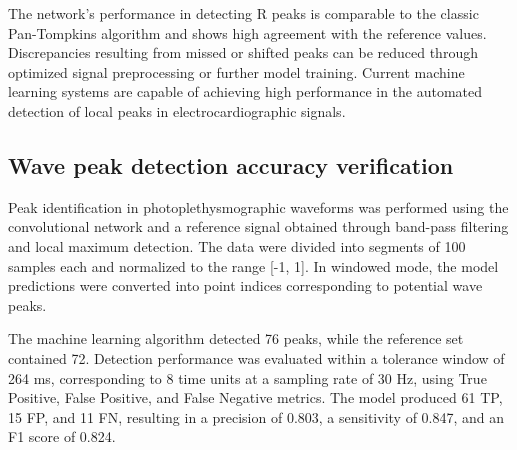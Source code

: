\documentclass{citask}
\begin{document}
The network’s performance in detecting R peaks is comparable to the classic Pan-Tompkins algorithm and shows high agreement with the reference values. Discrepancies resulting from missed or shifted peaks can be reduced through optimized signal preprocessing or further model training. Current machine learning systems are capable of achieving high performance in the automated detection of local peaks in electrocardiographic signals.

\subsection{Wave peak detection accuracy verification}
Peak identification in photoplethysmographic waveforms was performed using the convolutional network and a reference signal obtained through band-pass filtering and local maximum detection. The data were divided into segments of 100 samples each and normalized to the range [-1, 1]. In windowed mode, the model predictions were converted into point indices corresponding to potential wave peaks.

The machine learning algorithm detected 76 peaks, while the reference set contained 72. Detection performance was evaluated within a tolerance window of 264 ms, corresponding to 8 time units at a sampling rate of 30 Hz, using True Positive, False Positive, and False Negative metrics. The model produced 61 TP, 15 FP, and 11 FN, resulting in a precision of 0.803, a sensitivity of 0.847, and an F1 score of 0.824.
\end{document}

